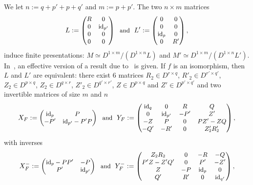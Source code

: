 \documentclass{ifacconf}
\newcommand\id[1]{\text{id}_{#1}}
\begin{document}
We let $n:=q+p'+p+q'$ and $m:=p+p'$. The two $n\times m$ matrices
\medskip
\begin{equation}\label{equ:def_of_L}
  \begin{small}
    L:=\begin{pmatrix}
    R & 0 \\
    0 & \id{p'} \\
    0 & 0 \\
    0 & 0
    \end{pmatrix}\ \ \text{and}\ \
    L':=\begin{pmatrix}
    0 & 0 \\
    0 & 0 \\
    \id{p} & 0 \\
    0 & R'
    \end{pmatrix},
  \end{small}
\end{equation}
\medskip
induce finite presentations: $M\simeq D^{1\times m}/(D^{1\times n}L)$ 
and $M'\simeq D^{1\times m}/(D^{1\times n}L')$. In~\cite{ClQu:11}, an
effective version of a result due to~\cite{Fi:36} is given. If $f$ is an
isomorphism, then $L$ and $L'$ are equivalent: there exist $6$ matrices
$R_2\in D^{r\times q}$, $R'_2\in D^{r'\times q'}$,
$Z_2\in D^{p\times q}$, $Z_2\in D^{q\times r}$,
$Z'_2\in D^{q'\times r'}$, $Z\in D^{p\times q}$ and
$Z'\in D^{p'\times q'}$ and two invertible matrices of size $m$ and $n$
\medskip
\begin{equation}\label{equ:def_of_XF_YF}
  \begin{small}
    X_F:=\begin{pmatrix}
    \id{p} & P \\
    -P' & \id{p'}-P'P
  \end{pmatrix}\ \ \text{and}\ \
    Y_F:=\begin{pmatrix}
    \id{q} & 0 & R & Q \\
    0 & \id{p'} & -P' & Z' \\
    -Z & P & 0 & PZ'-ZQ \\
    -Q' & -R' & 0 & Z'_2R'_2
    \end{pmatrix},
  \end{small}
\end{equation}
\medskip
with inverses
\medskip
\begin{equation}\label{equ:def_of_XF-_YF-}
  \begin{small}
    X_F^-:=\begin{pmatrix}
    \id{p}-PP' & -P \\
    P' & \id{p'}
  \end{pmatrix}\ \ \text{and}\ \
    Y_F^-:=\begin{pmatrix}
    Z_2R_2& 0 & -R & -Q \\
    P'Z-Z'Q' & 0 & P' & -Z' \\
    Z & -P & \id{p} & 0 \\
    Q' & R' & 0 & \id{q'}
    \end{pmatrix},
  \end{small}
\end{equation}
\end{document}
